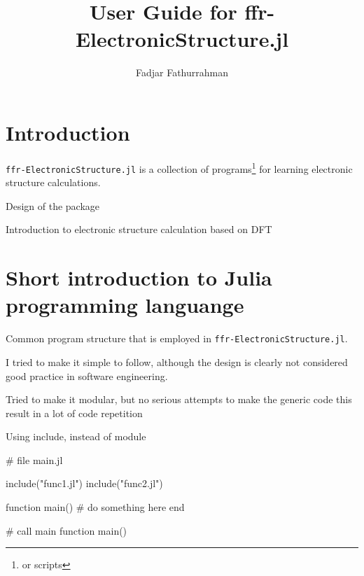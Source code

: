 \documentclass[a4paper,11pt]{extarticle}
\begin{document}
\title{User Guide for {\ttfamily ffr-ElectronicStructure.jl}}
\author{Fadjar Fathurrahman}
\date{}
\maketitle

\tableofcontents

\section{Introduction}

\verb|ffr-ElectronicStructure.jl| is a collection of programs\footnote{or scripts}
for learning electronic structure calculations.

Design of the package

Introduction to electronic structure calculation based on DFT

\section{Short introduction to Julia programming languange}

Common program structure that is employed in {\tt ffr-ElectronicStructure.jl}.

I tried to make it simple to follow, although the design is clearly not considered
good practice in software engineering.

Tried to make it modular, but no serious attempts to make the generic code
this result in a lot of code repetition

Using include, instead of module

\begin{juliacode}
# file main.jl

include("func1.jl")
include("func2.jl")

function main()
  # do something here
end

# call main function
main()
\end{juliacode}
\end{document}
